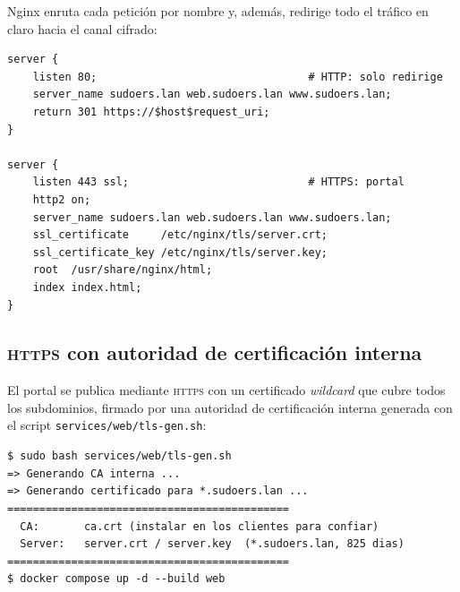 
Nginx enruta cada petici\'on por nombre y, adem\'as, redirige todo el
tr\'afico en claro hacia el canal cifrado:

\begin{lstlisting}[style=terminal]
server {
    listen 80;                                 # HTTP: solo redirige
    server_name sudoers.lan web.sudoers.lan www.sudoers.lan;
    return 301 https://$host$request_uri;
}

server {
    listen 443 ssl;                            # HTTPS: portal
    http2 on;
    server_name sudoers.lan web.sudoers.lan www.sudoers.lan;
    ssl_certificate     /etc/nginx/tls/server.crt;
    ssl_certificate_key /etc/nginx/tls/server.key;
    root  /usr/share/nginx/html;
    index index.html;
}
\end{lstlisting}


\subsection{\textsc{https} con autoridad de certificaci\'on interna}

El portal se publica mediante \textsc{https} con un certificado
\textit{wildcard} que cubre todos los subdominios, firmado por una
autoridad de certificaci\'on interna generada con el script
\texttt{services/web/tls-gen.sh}:

\begin{lstlisting}[style=terminal]
$ sudo bash services/web/tls-gen.sh
=> Generando CA interna ...
=> Generando certificado para *.sudoers.lan ...
============================================
  CA:       ca.crt (instalar en los clientes para confiar)
  Server:   server.crt / server.key  (*.sudoers.lan, 825 dias)
============================================
$ docker compose up -d --build web
\end{lstlisting}

